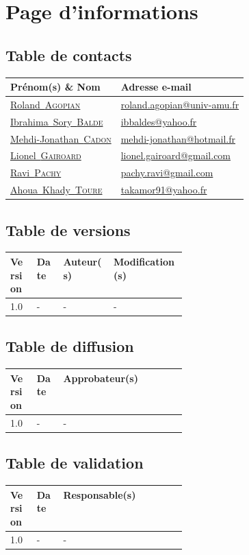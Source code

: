 \documentclass[11pt,fleqn]{book} %
\makeatletter
\newcommand{\rolandemail}{\href{mailto:roland.agopian@univ-amu.fr}{roland.agopian@univ-amu.fr}\xspace}
\newcommand{\raviemail}{\href{mailto:pachy.ravi@gmail.com}{pachy.ravi@gmail.com}\xspace}
\newcommand{\mjemail}{\href{mailto:mehdi-jonathan@hotmail.fr}{mehdi-jonathan@hotmail.fr}\xspace}
\newcommand{\lionelemail}{\href{mailto:lionel.gairoard@gmail.com}{lionel.gairoard@gmail.com}\xspace}
\newcommand{\ibrahimaemail}{\href{mailto:ibbaldes@yahoo.fr}{ibbaldes@yahoo.fr}\xspace}
\newcommand{\khadyemail}{\href{mailto:takamor91@yahoo.fr}{takamor91@yahoo.fr}\xspace}
\newcommand{\roland}{\href{mailto:roland.agopian@univ-amu.fr}{Roland~\textsc{Agopian}}\xspace}
\newcommand{\ravi}{\href{mailto:pachy.ravi@gmail.com}{Ravi~\textsc{Pachy}}\xspace}
\newcommand{\mj}{\href{mailto:mehdi-jonathan@hotmail.fr}{Mehdi-Jonathan~\textsc{Cadon}}\xspace}
\newcommand{\lionel}{\href{mailto:lionel.gairoard@gmail.com}{Lionel~\textsc{Gairoard}}\xspace}
\newcommand{\ibrahima}{\href{mailto:ibbaldes@yahoo.fr}{Ibrahima~Sory~\textsc{Balde}}\xspace}
\newcommand{\khady}{\href{mailto:takamor91@yahoo.fr}{Ahoua~Khady~\textsc{Toure}}\xspace}
\makeatother
\begin{document}
\newpage
{} %

\pagestyle{fancy} %

\chapter*{Page d'informations}

\section*{Table de contacts}
\begin{tabularx}{\linewidth}{X X}
	\toprule
	Prénom(s) \& Nom & Adresse e-mail \\
	\midrule
	\roland & \rolandemail \\
	\hline
	\ibrahima & \ibrahimaemail \\
	\hline
	\mj & \mjemail \\
	\hline
	\lionel & \lionelemail \\
	\hline
	\ravi & \raviemail \\
	\hline
	\khady & \khadyemail \\
	\bottomrule
\end{tabularx}

\section*{Table de versions}
\begin{tabularx}{\linewidth}{m{0.15\linewidth} m{0.15\linewidth} X X}
	\toprule
	Version & Date & Auteur(s) & Modification(s) \\
	\midrule
	1.0 & - & - & - \\
	\bottomrule
\end{tabularx}

\section*{Table de diffusion}
\begin{tabularx}{\linewidth}{m{0.15\linewidth} m{0.15\linewidth} X}
	\toprule
	Version & Date & Approbateur(s) \\
	\midrule
	1.0 & - & - \\
	\bottomrule
\end{tabularx}

\section*{Table de validation}
\begin{tabularx}{\linewidth}{m{0.15\linewidth} m{0.15\linewidth} X}
	\toprule
	Version & Date & Responsable(s) \\
	\midrule
	1.0 & - & - \\
	\bottomrule
\end{tabularx}
\end{document}
